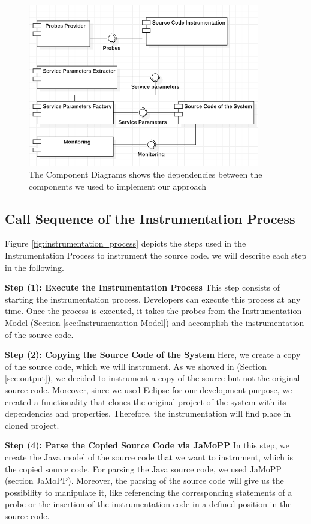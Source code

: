 \begin{figure}[h]
\centering
\includegraphics[width=0.9\textwidth]{figures/architecture}
\caption{The Component Diagrams shows the dependencies between the components we used to implement our approach}
\label{fig:architecture}
\end{figure}

\subsection{Call Sequence of the Instrumentation Process}
\label{sec:Call Sequence of the Instrumentation Process}
Figure \ref{fig:instrumentation_process} depicts the steps used in the Instrumentation Process to instrument the source code. we will describe each step in the following. 

\textbf{Step (1): Execute the Instrumentation Process}
This step consists of starting the instrumentation process. Developers can execute this process at any time. Once the process is executed, it takes the probes from the Instrumentation Model (Section \ref{sec:Instrumentation Model}) and accomplish the instrumentation of the source code. 

\textbf{Step (2): Copying the Source Code of the System}
Here, we create a copy of the source code, which we will instrument. As we showed in (Section \ref{sec:output}), we decided to instrument a copy of the source but not the original source code. Moreover, since we used Eclipse for our development purpose, we created a functionality that clones the original project of the system with its dependencies and properties. Therefore, the instrumentation will find place in cloned project.  

\textbf{Step (4): Parse the Copied Source Code via JaMoPP}
In this step, we create the Java model of the source code that we want to instrument, which is the copied source code. For parsing the Java source code, we used JaMoPP (section JaMoPP). Moreover, the parsing of the source code will give us the possibility to manipulate it, like referencing the corresponding statements of a probe or the insertion of the instrumentation code in a defined position in the source code.

